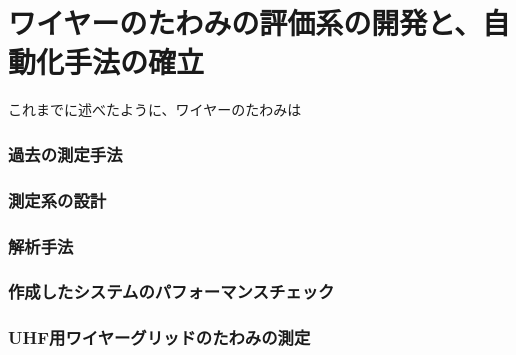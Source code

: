 \documentclass[../../main.tex]{subfiles}
\begin{document}
\chapter{ワイヤーのたわみの評価系の開発と、自動化手法の確立}
これまでに述べたように、ワイヤーのたわみは

\subsection{過去の測定手法}

\subsection{測定系の設計}

\subsection{解析手法}

\subsection{作成したシステムのパフォーマンスチェック}

\subsection{UHF用ワイヤーグリッドのたわみの測定}
\end{document}
